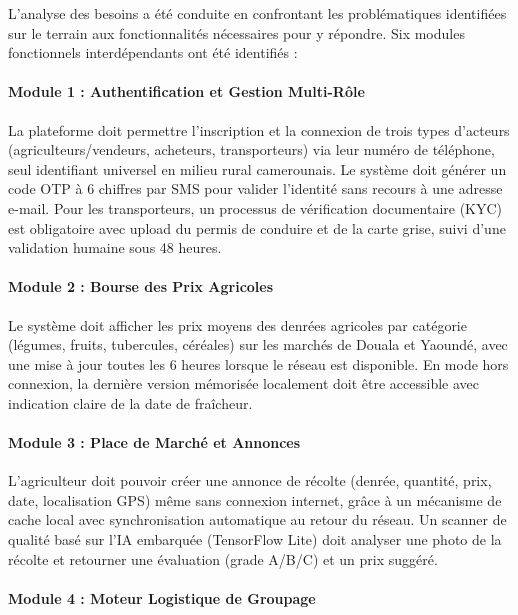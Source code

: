 \documentclass[12pt,a4paper]{report}
\begin{document}
L'analyse des besoins a été conduite en confrontant les problématiques identifiées sur le terrain aux fonctionnalités nécessaires pour y répondre. Six modules fonctionnels interdépendants ont été identifiés :

\paragraph{Module 1 : Authentification et Gestion Multi-Rôle}

La plateforme doit permettre l'inscription et la connexion de trois types d'acteurs (agriculteurs/vendeurs, acheteurs, transporteurs) via leur numéro de téléphone, seul identifiant universel en milieu rural camerounais. Le système doit générer un code OTP à 6 chiffres par SMS pour valider l'identité sans recours à une adresse e-mail. Pour les transporteurs, un processus de vérification documentaire (KYC) est obligatoire avec upload du permis de conduire et de la carte grise, suivi d'une validation humaine sous 48 heures.

\paragraph{Module 2 : Bourse des Prix Agricoles}

Le système doit afficher les prix moyens des denrées agricoles par catégorie (légumes, fruits, tubercules, céréales) sur les marchés de Douala et Yaoundé, avec une mise à jour toutes les 6 heures lorsque le réseau est disponible. En mode hors connexion, la dernière version mémorisée localement doit être accessible avec indication claire de la date de fraîcheur.

\paragraph{Module 3 : Place de Marché et Annonces}

L'agriculteur doit pouvoir créer une annonce de récolte (denrée, quantité, prix, date, localisation GPS) même sans connexion internet, grâce à un mécanisme de cache local avec synchronisation automatique au retour du réseau. Un scanner de qualité basé sur l'IA embarquée (TensorFlow Lite) doit analyser une photo de la récolte et retourner une évaluation (grade A/B/C) et un prix suggéré.

\paragraph{Module 4 : Moteur Logistique de Groupage}
\end{document}
